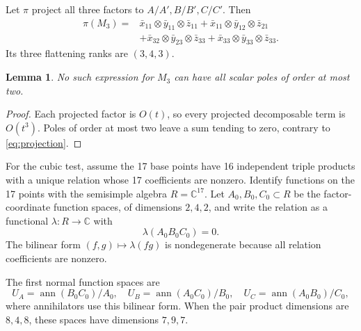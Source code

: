 \documentclass[11pt]{article}
\newtheorem{lemma}[theorem]{Lemma}
\theoremstyle{definition}\newtheorem{definition}[theorem]{Definition}
\theoremstyle{remark}\newtheorem{remark}[theorem]{Remark}
\newcommand{\C}{\mathbb C}
\newcommand{\ann}{\operatorname{ann}}
\begin{document}
Let $\pi$ project all three factors to $A/A',B/B',C/C'$. Then
\begin{equation}\label{eq:projection}
\begin{split}
\pi(M_3)={}&\bar x_{11}\otimes\bar y_{11}\otimes\bar z_{11}
 +\bar x_{11}\otimes\bar y_{12}\otimes\bar z_{21}\\
&+\bar x_{32}\otimes\bar y_{23}\otimes\bar z_{33}
 +\bar x_{33}\otimes\bar y_{33}\otimes\bar z_{33}.
\end{split}
\end{equation}
Its three flattening ranks are $(3,4,3)$.

\begin{lemma}\label{lem:pole2}
No such expression for $M_3$ can have all scalar poles of order at most two.
\end{lemma}
\begin{proof}
Each projected factor is $O(t)$, so every projected decomposable term is
$O(t^3)$. Poles of order at most two leave a sum tending to zero, contrary
to \eqref{eq:projection}.
\end{proof}

For the cubic test, assume the 17 base points have 16 independent triple
products with a unique relation whose 17 coefficients are nonzero. Identify
functions on the 17 points with the semisimple algebra $R=\C^{17}$. Let
$A_0,B_0,C_0\subset R$ be the factor-coordinate function spaces, of dimensions
$2,4,2$, and write the relation as a functional $\lambda:R\to\C$ with
\[
 \lambda(A_0B_0C_0)=0.
\]
The bilinear form $(f,g)\mapsto\lambda(fg)$ is nondegenerate because all
relation coefficients are nonzero.

The first normal function spaces are
\begin{equation}\label{eq:normalspaces}
 U_A=\ann(B_0C_0)/A_0,\quad
 U_B=\ann(A_0C_0)/B_0,\quad
 U_C=\ann(A_0B_0)/C_0,
\end{equation}
where annihilators use this bilinear form. When the pair product dimensions
are $8,4,8$, these spaces have dimensions $7,9,7$.
\end{document}
